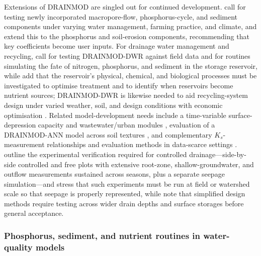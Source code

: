 Extensions of DRAINMOD are singled out for continued development.
\textcite{Askar2021b} call for testing newly incorporated
macropore-flow, phosphorus-cycle, and sediment components under varying water
management, farming practice, and climate, and \textcite{Askar2025} extend this
to the phosphorus and soil-erosion components, recommending that key
coefficients become user inputs. For drainage water management and recycling,
\textcite{Moursi2022} call for testing DRAINMOD-DWR against field data and for
routines simulating the fate of nitrogen, phosphorus, and sediment in the
storage reservoir, while \textcite{Moursi2023} add that the reservoir's
physical, chemical, and biological processes must be investigated to optimise
treatment and to identify when reservoirs become nutrient sources; DRAINMOD-DWR
is likewise needed to aid recycling-system design under varied weather, soil,
and design conditions with economic optimisation \parencite{Moursi2024}. Related
model-development needs include a time-variable surface-depression capacity and
wastewater/urban modules \parencite{Abduljaleel2023}, evaluation of a
DRAINMOD-ANN model across soil textures \parencite{Awad2022}, and complementary
$K_s$-measurement relationships and evaluation methods in data-scarce settings
\parencite{NabiSichani2012,Salazar2008}. \textcite{Youssef2018} outline the
experimental verification required for controlled drainage---side-by-side
controlled and free plots with extensive root-zone, shallow-groundwater, and
outflow measurements sustained across seasons, plus a separate seepage
simulation---and \textcite{Skaggs2010} stress that such experiments must be run
at field or watershed scale so that seepage is properly represented, while
\textcite{Skaggs2006} note that simplified design methods require testing across
wider drain depths and surface storages before general acceptance.

\subsubsection{Phosphorus, sediment, and nutrient routines in water-quality models}

